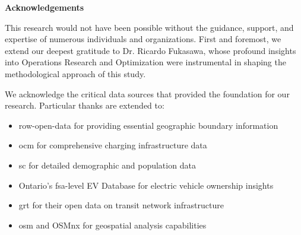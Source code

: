 \begin{center}\textbf{Acknowledgements}\end{center}

This research would not have been possible without the guidance, support, and expertise of numerous individuals and organizations. First and foremost, we extend our deepest gratitude to Dr. Ricardo Fukasawa, whose profound insights into Operations Research and Optimization were instrumental in shaping the methodological approach of this study.

We acknowledge the critical data sources that provided the foundation for our research. Particular thanks are extended to:

\begin{itemize}
    \item \gls{row-open-data} for providing essential geographic boundary information
    \item \gls{ocm} for comprehensive charging infrastructure data
    \item \gls{sc} for detailed demographic and population data
    \item Ontario's \gls{fsa}-level EV Database for electric vehicle ownership insights
    \item \gls{grt} for their open data on transit network infrastructure
    \item \gls{osm} and OSMnx \cite{boeing_modeling_2024} for geospatial analysis capabilities
\end{itemize}

\cleardoublepage
{}    %

\renewcommand\contentsname{Table of Contents}
\tableofcontents
\cleardoublepage
{}    %

\listoffigures
\cleardoublepage
{}		%

\listoftables
\cleardoublepage
{}		%

\renewcommand*{\abbreviationsname}{List of Abbreviations}
\printglossary[type=abbreviations]
\cleardoublepage
{}		%

\printglossary[type=symbols]
\cleardoublepage
{}		%



